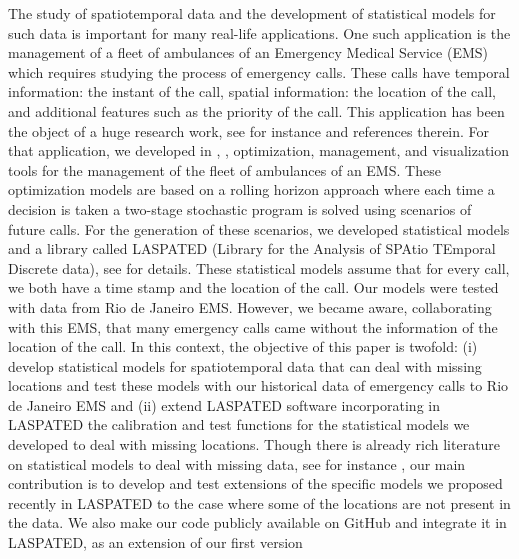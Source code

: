 The study of spatiotemporal data
and the development of statistical models
for such data is important for many real-life applications. One such application is the 
management of a fleet of ambulances
of an Emergency Medical Service (EMS)
which requires studying the process of
emergency calls. These calls
have temporal information: the instant
of the call, spatial information: the location
of the call, and additional features such
as the priority of the call. This application
has been the object of a huge research work,
see for instance
\citep{fitz:73,gree:04,chai:72,jagt:17a,lisay:16,mcla:13b,mcla:13a,band:14,band:12,schm:12,lees:12,lees:11,ande:07,mayo:13,swov:73b,swov:73a,tore:71,dask:83,dask:81,berl:74,chur:74,Talarico2015} and references therein.
For that application, we developed
in \citep{guiklevhn2022}, \citep{ourheuristics23a}
\citep{websiteambrouting24}, optimization,
management, and visualization tools for
the management of the fleet of ambulances
of an EMS. These optimization models
are based on a rolling horizon approach 
\citep{guiguessagastiz2012,guiguessagastiz2010}
where each time a decision is taken a two-stage
stochastic program is solved using
scenarios of future calls. For 
the generation of these scenarios, we developed
statistical models and a library called LASPATED (Library for the Analysis of SPAtio TEmporal
Discrete data), 
see \citep{laspatedpaper, laspatedmanual}
for details. These statistical models assume that
for every call, we both have a time stamp
and the location of the call. 
Our models were tested with data from Rio
de Janeiro EMS.
However, we became aware, collaborating
with this EMS, that many emergency calls came without
the information of the location of the call. In this context,
the objective of this paper is twofold: (i)
develop statistical models for spatiotemporal
data that can deal with missing locations
and test these models with our historical
data of emergency calls to Rio de Janeiro EMS
and (ii) extend LASPATED software incorporating
in LASPATED the
calibration and test functions for the statistical
models we developed to deal with missing
locations.
Though there is already rich literature
on statistical models to deal with missing data, see for instance \citep{bookmd1, bookmd2,bookmd3},
our main contribution is to develop and test
extensions
of the specific models we proposed recently in
LASPATED
\citep{laspatedpaper, laspatedmanual}
to the case where some of the locations are not
present in the data. 
We also make our code
publicly available on GitHub and integrate it
in LASPATED, as an extension of our first version
